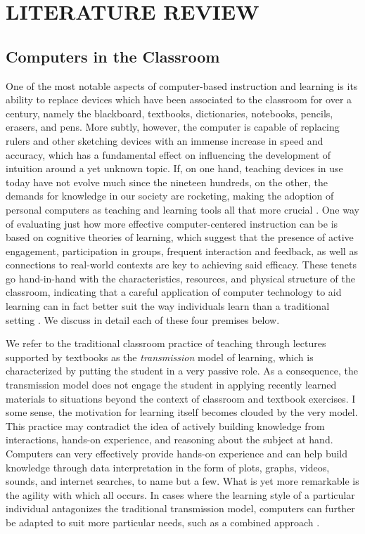 
\chapter{LITERATURE REVIEW}

\section{Computers in the Classroom}

One of the most notable aspects of computer-based instruction and learning is its ability to replace devices which have been associated to the classroom for over a century, namely the blackboard, textbooks, dictionaries, notebooks, pencils, erasers, and pens. More subtly, however, the computer is capable of replacing rulers and other sketching devices with an immense increase in speed and accuracy, which has a fundamental effect on influencing the development of intuition around a yet unknown topic. If, on one hand, teaching devices in use today have not evolve much since the nineteen hundreds, on the other, the demands for knowledge in our society are rocketing, making the adoption of personal computers as teaching and learning tools all that more crucial \cite[77]{Roschelle2000}. One way of evaluating just how more effective computer-centered instruction can be is based on cognitive theories of learning, which suggest that the presence of active engagement, participation in groups, frequent interaction and feedback, as well as connections to real-world contexts are key to achieving said efficacy. These tenets go hand-in-hand with the characteristics, resources, and physical structure of the classroom, indicating that a careful application of computer technology to aid learning can in fact better suit the way individuals learn than a traditional setting \cite[79]{Roschelle2000}. We discuss in detail each of these four premises below.

We refer to the traditional classroom practice of teaching through lectures supported by textbooks as the \emph{transmission} model of learning, which is characterized by putting the student in a very passive role. As a consequence, the transmission model does not engage the student in applying recently learned materials to situations beyond the context of classroom and textbook exercises. I some sense, the motivation for learning itself becomes clouded by the very model. This practice may contradict the idea of actively building knowledge from interactions, hands-on experience, and reasoning about the subject at hand. Computers can very effectively provide hands-on experience and can help build knowledge through data interpretation in the form of plots, graphs, videos, sounds, and internet searches, to name but a few. What is yet more remarkable is the agility with which all occurs. In cases where the learning style of a particular individual antagonizes the traditional transmission model, computers can further be adapted to suit more particular needs, such as a combined approach \cite[80]{Roschelle2000}.

